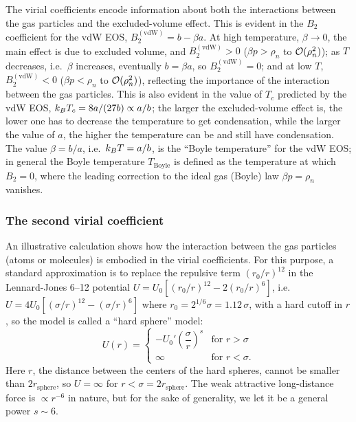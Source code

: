 The virial coefficients encode information about both the interactions between the gas particles and the
excluded-volume effect. This is evident in the $B_2$ coefficient for the vdW EOS, $B_2^{(\text{vdW})} = b-\beta a$.
At high temperature, $\beta\to 0$, the main effect is due to excluded volume, and $B_2^{(\text{vdW})}>0$
($\beta p>\rho_n$ to $\mathcal{O}(\rho_n^2)$); as $T$ decreases, i.e.\ $\beta$ increases, eventually $b = \beta a$, so
$B_2^{(\text{vdW})} = 0$; and at low $T$, $B_2^{(\text{vdW})}<0$ ($\beta p<\rho_n$ to $\mathcal{O}(\rho_n^2)$),
reflecting the importance of the interaction between the gas particles. This is also evident in the value of $T_c$
predicted by the vdW EOS, $k_{B} T_c = 8a/(27b)\propto a/b$; the larger the excluded-volume effect is, the
lower one has to decrease the temperature to get condensation, while the larger the value of $a$, the higher the
temperature can be and still have condensation. The value $\beta = b/a$, i.e.\ $k_{B} T = a/b$, is the
``Boyle temperature'' for the vdW EOS; in general the Boyle temperature $T_{\text{Boyle}}$ is defined as the
temperature at which $B_2 = 0$, where the leading correction to the ideal gas (Boyle) law $\beta p = \rho_n$
vanishes.

\subsubsection*{The second virial coefficient}

An illustrative calculation shows how the interaction between the gas particles (atoms or molecules) is embodied in
the virial coefficients. For this purpose, a standard approximation is to replace the repulsive term
$\left(r_0/r\right)^{12}$ in the Lennard-Jones 6--12 potential
$U = U_0\left[\left(r_0/r\right)^{12} - 2\left(r_0/r\right)^6\right]$, i.e.\
$U = 4U_0\left[\left(\sigma/r\right)^{12} - \left(\sigma/r\right)^6\right]$ where $r_0 = 2^{1/6}\sigma = 1.12\,\sigma$, with a hard cutoff in
$r$, so the model is called a ``hard sphere'' model:
\begin{equation}
  U(r) = \begin{cases} -U_0'\left(\dfrac{\sigma}{r}\right)^s & \text{for } r>\sigma\\[6pt] \infty & \text{for } r<\sigma .\end{cases}
\end{equation}
Here $r$, the distance between the centers of the hard spheres, cannot be smaller than $2r_{\text{sphere}}$, so
$U = \infty$ for $r<\sigma = 2r_{\text{sphere}}$. The weak attractive long-distance force is $\propto r^{-6}$ in
nature, but for the sake of generality, we let it be a general power $s\sim 6$.

